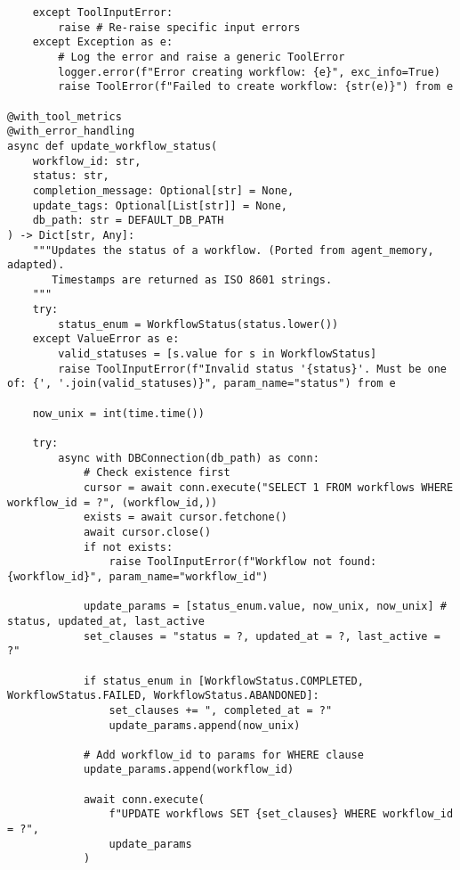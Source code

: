 \documentclass[12pt,a4paper]{article}
\begin{document}
\begin{pageablecode}
\begin{verbatim}
    except ToolInputError:
        raise # Re-raise specific input errors
    except Exception as e:
        # Log the error and raise a generic ToolError
        logger.error(f"Error creating workflow: {e}", exc_info=True)
        raise ToolError(f"Failed to create workflow: {str(e)}") from e

@with_tool_metrics
@with_error_handling
async def update_workflow_status(
    workflow_id: str,
    status: str,
    completion_message: Optional[str] = None,
    update_tags: Optional[List[str]] = None,
    db_path: str = DEFAULT_DB_PATH
) -> Dict[str, Any]:
    """Updates the status of a workflow. (Ported from agent_memory, adapted).
       Timestamps are returned as ISO 8601 strings.
    """
    try:
        status_enum = WorkflowStatus(status.lower())
    except ValueError as e:
        valid_statuses = [s.value for s in WorkflowStatus]
        raise ToolInputError(f"Invalid status '{status}'. Must be one of: {', '.join(valid_statuses)}", param_name="status") from e

    now_unix = int(time.time())

    try:
        async with DBConnection(db_path) as conn:
            # Check existence first
            cursor = await conn.execute("SELECT 1 FROM workflows WHERE workflow_id = ?", (workflow_id,))
            exists = await cursor.fetchone()
            await cursor.close()
            if not exists:
                raise ToolInputError(f"Workflow not found: {workflow_id}", param_name="workflow_id")

            update_params = [status_enum.value, now_unix, now_unix] # status, updated_at, last_active
            set_clauses = "status = ?, updated_at = ?, last_active = ?"

            if status_enum in [WorkflowStatus.COMPLETED, WorkflowStatus.FAILED, WorkflowStatus.ABANDONED]:
                set_clauses += ", completed_at = ?"
                update_params.append(now_unix)
            
            # Add workflow_id to params for WHERE clause
            update_params.append(workflow_id)

            await conn.execute(
                f"UPDATE workflows SET {set_clauses} WHERE workflow_id = ?",
                update_params
            )


\end{verbatim}
\end{pageablecode}
\end{document}

